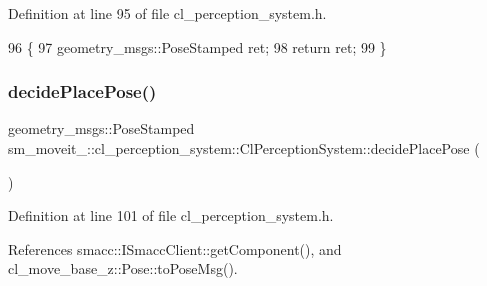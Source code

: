 Definition at line 95 of file cl\+\_\+perception\+\_\+system.\+h.


\begin{DoxyCode}
96             \{
97                 geometry\_msgs::PoseStamped ret;
98                 \textcolor{keywordflow}{return} ret;
99             \}
\end{DoxyCode}
\mbox{\label{classsm__moveit__4_1_1cl__perception__system_1_1ClPerceptionSystem_ab2431f4f2f48fc474e7b2f868bdec60d}} 
\subsubsection{\texorpdfstring{decide\+Place\+Pose()}{decidePlacePose()}}
{\footnotesize\ttfamily geometry\+\_\+msgs\+::\+Pose\+Stamped sm\+\_\+moveit\+\_\+::cl\+\_\+perception\+\_\+system\+::\+Cl\+Perception\+System\+::decide\+Place\+Pose (\begin{DoxyParamCaption}{ }\end{DoxyParamCaption})\hspace{0.3cm}{\ttfamily [inline]}}



Definition at line 101 of file cl\+\_\+perception\+\_\+system.\+h.



References smacc\+::\+I\+Smacc\+Client\+::get\+Component(), and cl\+\_\+move\+\_\+base\+\_\+z\+::\+Pose\+::to\+Pose\+Msg().


